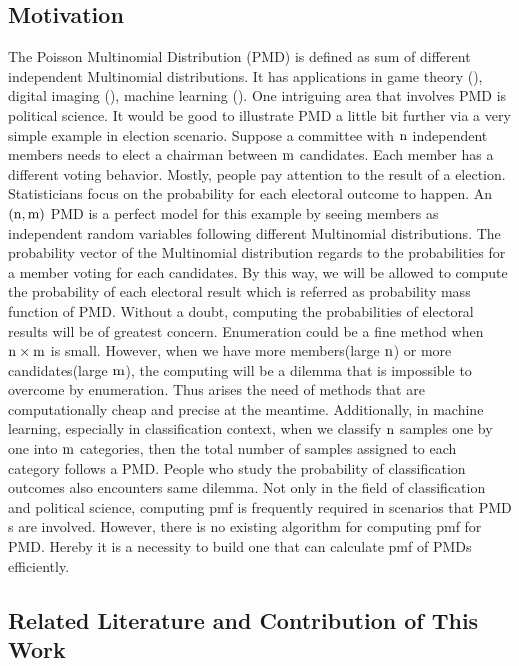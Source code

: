 \documentclass[12pt]{article}
\newcommand{\PMD}{\textrm{PMD}}
\begin{document}
\subsection{Motivation}

The Poisson Multinomial Distribution ($\PMD$) is defined as sum of different independent Multinomial distributions. It has applications in game theory (), digital imaging (), machine learning (). One intriguing area that involves $\PMD$ is political science. It would be good to illustrate $\PMD$ a little bit further via a very simple example in election scenario. Suppose a committee with $\rm n$  independent members needs to elect a chairman between $\rm m$ candidates. Each member has a different voting behavior. Mostly, people pay attention to the result of a election. Statisticians focus on the probability for each electoral outcome to happen. An $\rm (n,m)$ $\PMD$ is a perfect model for this example by seeing members as independent random variables following different Multinomial distributions. The probability vector of the Multinomial distribution regards to the probabilities for a member voting for each candidates. By this way, we will be allowed to compute the probability of each electoral result which is referred as probability mass function of $\PMD$. Without a doubt, computing the probabilities of electoral results will be of greatest concern. Enumeration could be a fine method when $\rm n \times m$ is small. However, when we have more members(large $\rm n$) or more candidates(large $\rm m$), the computing will be a dilemma that is impossible to overcome by enumeration. Thus arises the need of methods that are computationally cheap and precise at the meantime. Additionally, in machine learning, especially in classification context, when we classify $\rm n$ samples one by one into $\rm m$ categories, then the total number of samples assigned to each category follows a $\PMD$. People who study the probability of classification outcomes also encounters same dilemma. Not only in the field of classification and political science, computing pmf is frequently required in scenarios that $\PMD$s are involved. However, there is no existing algorithm for computing pmf for PMD. Hereby it is a necessity to build one that can calculate pmf of $\PMD$s efficiently. 



\subsection{Related Literature and Contribution of This Work}
\end{document}
